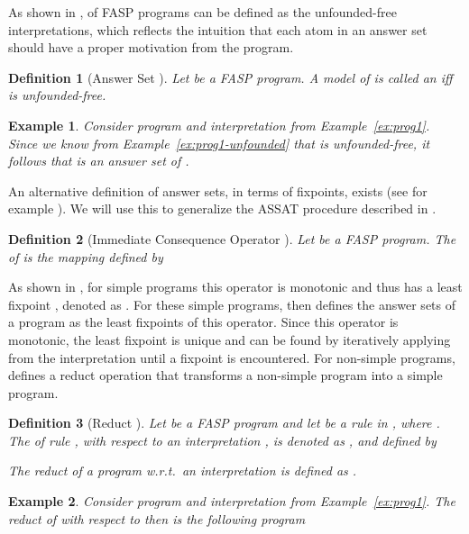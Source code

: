 \documentclass{tlp}
\newtheorem{definition}{Definition}
\newtheorem{example}{Example}
\begin{document}
As shown in \cite{FASP:amai},  of FASP programs can be defined as the unfounded-free interpretations, which reflects the intuition that each atom in an answer set should have a proper motivation from the program.

\begin{definition}[Answer Set \cite{FASP:amai}]\label{def:kanswersets}
 Let  be a FASP program. A model  of  is called an  iff  is unfounded-free.
\end{definition}

\begin{example}
Consider program  and interpretation  from Example~\ref{ex:prog1}. Since we know from Example~\ref{ex:prog1-unfounded} that  is unfounded-free, it follows that  is an answer set of .
\end{example}

An alternative definition of answer sets, in terms of fixpoints, exists (see for example \cite{Luka06}). We will use this to generalize the ASSAT procedure described in \cite{assat-linzhao}. 

\begin{definition}[Immediate Consequence Operator \cite{Luka06}]\label{def:imcons}
 Let  be a FASP program. The  of  is the mapping  defined by
  
\end{definition}

As shown in \cite{Luka06}, for simple programs this operator is monotonic and thus has a least fixpoint \cite{tarski:lattice}, denoted as . For these simple programs, \cite{Luka06} then defines the answer sets of a program as the least fixpoints of this operator. Since this operator is monotonic, the least fixpoint is unique and can be found by iteratively applying  from the interpretation  until a fixpoint is encountered. For non-simple programs, \cite{Luka06} defines a reduct operation that transforms a non-simple program into a simple program.

\begin{definition}[Reduct \cite{Luka06}]\label{def:reduct}
 Let  be a FASP program and let  be a rule in , where . The  of rule , with respect to an interpretation , is denoted as , and defined by
   
 The reduct of a program  w.r.t.~an interpretation  is defined as .
\end{definition}

\begin{example}\label{ex:prog1-reduct}
Consider program  and interpretation  from Example~\ref{ex:prog1}. The reduct of  with respect to  then is the following program
 
\end{example}
\end{document}
